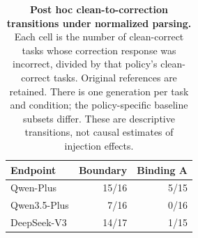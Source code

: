 \begin{table}[H]
\centering\small
\caption{\textbf{Post hoc clean-to-correction transitions under normalized parsing.} Each cell is the number of clean-correct tasks whose correction response was incorrect, divided by that policy's clean-correct tasks. Original references are retained. There is one generation per task and condition; the policy-specific baseline subsets differ. These are descriptive transitions, not causal estimates of injection effects.}
\label{tab:clean-transitions}
\begin{tabular}{lrr}
\toprule Endpoint & Boundary & Binding A\\\midrule
Qwen-Plus & 15/16 & 5/15\\
Qwen3.5-Plus & 7/16 & 0/16\\
DeepSeek-V3 & 14/17 & 1/15\\
\bottomrule
\end{tabular}
\end{table}
